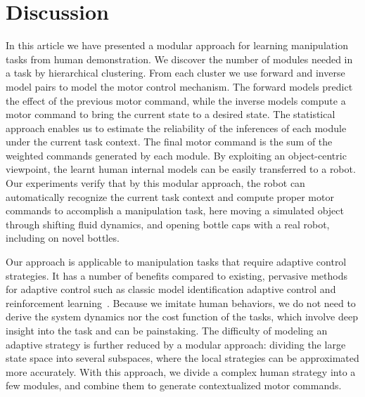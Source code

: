 \section{Discussion}
\label{sec:diss}


In this article we have presented a modular approach for learning
manipulation tasks from human demonstration. We discover the number of
modules needed in a task by hierarchical clustering. From each cluster
we use forward and inverse model pairs to model the motor control
mechanism. The forward models predict the effect of the previous motor
command, while the inverse models compute a motor command to bring the
current state to a desired state. The statistical approach enables us
to estimate the reliability of the inferences of each module under the
current task context. The final motor command is the sum of the weighted
commands generated by each module. By exploiting an object-centric
viewpoint, the learnt human internal models can be easily transferred
to a robot. Our experiments verify that by this modular approach, the
robot can automatically recognize the current task context and compute
proper motor commands to accomplish a manipulation task, here moving a
simulated object through shifting fluid dynamics, and opening
bottle caps with a real robot, including on novel bottles.


Our approach is applicable to manipulation tasks that require adaptive
control strategies. It has a number of benefits compared to existing,
pervasive methods for adaptive control such as classic model
identification adaptive control and reinforcement
learning~\citep{narendra1995adaptation,khalil2004modeling,buchli2011learning}. %
Because we imitate human behaviors, we do not need to derive the
system dynamics nor the cost function of the tasks, which involve deep
insight into the task and can be painstaking. The difficulty of
modeling an adaptive strategy is further reduced by a modular
approach: dividing the large state space into several subspaces, where
the local strategies can be approximated more accurately. With this
approach, we divide a complex human strategy into a few modules, and
combine them to generate contextualized motor commands.

